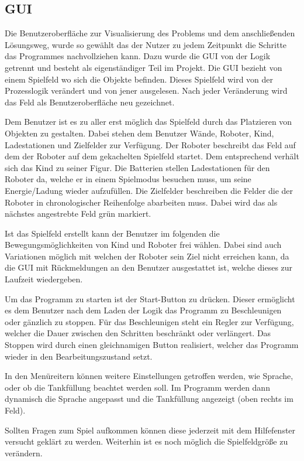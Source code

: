 \subsection{GUI}
Die Benutzeroberfläche zur Visualisierung des Problems und dem anschließenden Lösungsweg, wurde so gewählt das der Nutzer zu jedem Zeitpunkt die Schritte das Programmes nachvollziehen kann. Dazu wurde die GUI von der Logik getrennt und besteht als eigenständiger Teil im Projekt. Die GUI bezieht von einem Spielfeld wo sich die Objekte befinden. Dieses Spielfeld wird von der Prozesslogik verändert und von jener ausgelesen. Nach jeder Veränderung wird das Feld als Benutzeroberfläche neu gezeichnet. \par
Dem Benutzer ist es zu aller erst möglich das Spielfeld durch das Platzieren von Objekten zu gestalten. Dabei stehen dem Benutzer Wände, Roboter, Kind, Ladestationen und Zielfelder zur Verfügung. Der Roboter beschreibt das Feld auf dem der Roboter auf dem gekachelten Spielfeld startet. Dem entsprechend verhält sich das Kind zu seiner Figur. Die Batterien stellen Ladestationen für den Roboter da, welche er in einem Spielmodus besuchen muss, um seine Energie/Ladung wieder aufzufüllen. Die Zielfelder beschreiben die Felder die der Roboter in chronologischer Reihenfolge abarbeiten muss. Dabei wird das als nächstes angestrebte Feld grün markiert. \par
Ist das Spielfeld erstellt kann der Benutzer im folgenden die Bewegungsmöglichkeiten von Kind und Roboter frei wählen. Dabei sind auch Variationen möglich mit welchen der Roboter sein Ziel nicht erreichen kann, da die GUI mit Rückmeldungen an den Benutzer ausgestattet ist, welche dieses zur Laufzeit wiedergeben. \par
Um das Programm zu starten ist der Start-Button zu drücken. Dieser ermöglicht es dem Benutzer nach dem Laden der Logik das Programm zu Beschleunigen oder gänzlich zu stoppen. Für das Beschleunigen steht ein Regler zur Verfügung, welcher die Dauer zwischen den Schritten beschränkt oder verlängert. Das Stoppen wird durch einen gleichnamigen Button realisiert, welcher das Programm wieder in den Bearbeitungszustand setzt. \par
In den Menüreitern können weitere Einstellungen getroffen werden, wie Sprache, oder ob die Tankfüllung beachtet werden soll. Im Programm werden dann dynamisch die Sprache angepasst und die Tankfüllung angezeigt (oben rechts im Feld). \par
Sollten Fragen zum Spiel aufkommen können diese jederzeit mit dem Hilfefenster versucht geklärt zu werden. Weiterhin ist es noch möglich die Spielfeldgröße zu verändern. \par